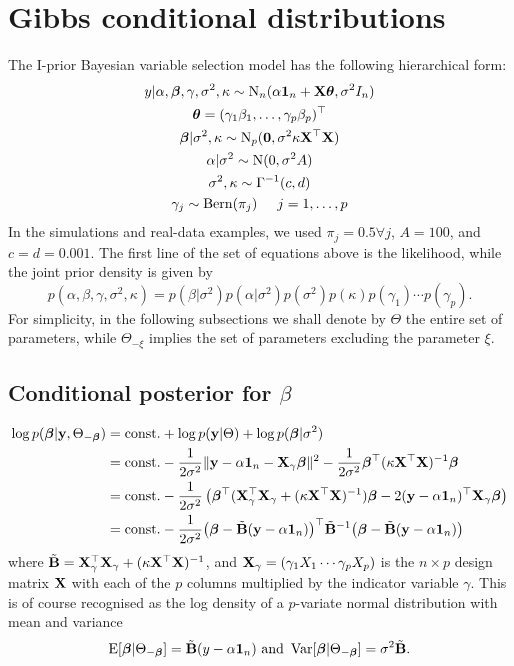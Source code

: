 \section{Gibbs conditional distributions}

The I-prior Bayesian variable selection model has the following hierarchical form:
\begin{align*}
  \begin{gathered}
    y|\alpha,{\bm\beta},\gamma,\sigma^2,\kappa \sim \operatorname{N}_n(\alpha{\mathbf 1}_n + {\mathbf X}{\bm\theta}, \sigma^2 I_n) \\
    {\bm\theta} = (\gamma_1\beta_1,\dots,\gamma_p\beta_p)^\top \\
    {\bm\beta}|\sigma^2,\kappa \sim \operatorname{N}_p({\mathbf 0},\sigma^2\kappa \mathbf X^\top \mathbf X) \\
    \alpha|\sigma^2 \sim \operatorname{N}(0,\sigma^2 A) \\
    \sigma^2,\kappa \sim \Gamma^{-1}(c,d) \\
    \gamma_j \sim \operatorname{Bern}(\pi_j) \hspace{0.5cm} j=1,\dots,p
  \end{gathered}
\end{align*}
In the simulations and real-data examples, we used $\pi_j=0.5 \forall j$, $A=100$, and $c=d=0.001$. 
The first line of the set of equations above is the likelihood, while the joint prior density is given by
\[
  p(\alpha,\beta,\gamma,\sigma^2,\kappa) = p(\beta|\sigma^2)p(\alpha|\sigma^2)p(\sigma^2)p(\kappa)p(\gamma_1)\cdots p(\gamma_p).
\]    
For simplicity, in the following subsections we shall denote by $\Theta$ the entire set of parameters, while $\Theta_{-\xi}$ implies the set of parameters excluding the parameter $\xi$.

\subsection{Conditional posterior for $\beta$}

\begin{align*}
  \log p({\bm\beta}|{\mathbf y},\Theta_{-{\bm\beta}}) 
  &= \text{const.}\hspace{0.01em} + \log p({\mathbf y}|\Theta) + \log p({\bm\beta}|\sigma^2) \\
  &= \text{const.}\hspace{0.01em} - \frac{1}{2\sigma^2} \Vert {\mathbf y} - \alpha {\mathbf 1}_n - {\mathbf X}_\gamma{\bm\beta} \Vert^2  
  - \frac{1}{2\sigma^2}{\bm\beta}^\top (\kappa \mathbf X^\top \mathbf X)^{-1} {\bm\beta} \\
  &= \text{const.}\hspace{0.01em} - \frac{1}{2\sigma^2} \left( {\bm\beta}^\top ({\mathbf X}_\gamma^\top {\mathbf X}_\gamma + (\kappa \mathbf X^\top \mathbf X)^{-1}) {\bm\beta} - 2({\mathbf y} - \alpha {\mathbf 1}_n)^\top {\mathbf X}_\gamma{\bm\beta} \right) \\
  &= \text{const.}\hspace{0.01em} - \frac{1}{2\sigma^2} \big({\bm\beta} - \tilde {{\mathbf B}}({\mathbf y} - \alpha {\mathbf 1}_n)\big)^\top \tilde {{\mathbf B}}^{-1} \big({\bm\beta} - \tilde {{\mathbf B}}({\mathbf y} - \alpha {\mathbf 1}_n)\big) 
\end{align*}
where $\tilde {{\mathbf B}} = {\mathbf X}_\gamma^\top {\mathbf X}_\gamma + (\kappa \mathbf X^\top \mathbf X)^{-1}$, and ${\mathbf X}_\gamma = (\gamma_1X_1 \cdots \gamma_pX_p)$ is the $n \times p$ design matrix ${\mathbf X}$ with each of the $p$ columns multiplied by the indicator variable $\gamma$.
This is of course recognised as the log density of a $p$-variate normal distribution with mean and variance
\[
  \operatorname{E}[{\bm\beta}|\Theta_{-{\bm\beta}}] = \tilde {{\mathbf B}}(y - \alpha {\mathbf 1}_n) \text{ and } \operatorname{Var}[{\bm\beta}|\Theta_{-{\bm\beta}}] = \sigma^2\tilde {{\mathbf B}}.
 \]

